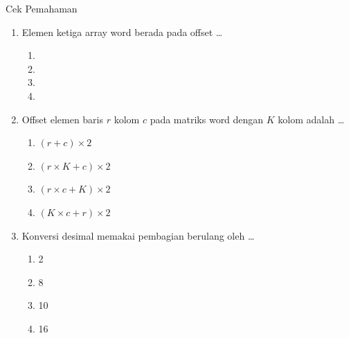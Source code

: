 \documentclass[aspectratio=169,11pt]{beamer}
\begin{document}
\begin{frame}{Cek Pemahaman}
\footnotesize
\begin{enumerate}
    \item Elemen ketiga array word  berada pada offset
          \dots
          \begin{enumerate}
              \item {} \quad \item {} \quad
              \item {} \quad \item {}
          \end{enumerate}

    \vspace{0.2em}
    \item Offset elemen baris $r$ kolom $c$ pada matriks word dengan
          $K$ kolom adalah \dots
          \begin{enumerate}
              \item $(r+c)\times2$
              \item $(r\times K+c)\times2$
              \item $(r\times c+K)\times2$
              \item $(K\times c+r)\times2$
          \end{enumerate}

    \vspace{0.2em}
    \item Konversi desimal memakai pembagian berulang oleh \dots
          \begin{enumerate}
              \item 2 \quad \item 8 \quad
              \item 10 \quad \item 16
          \end{enumerate}
\end{enumerate}
\end{frame}
\end{document}
